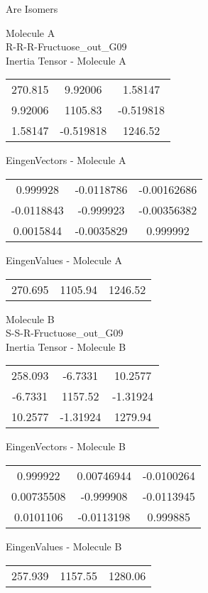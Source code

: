 \begin{center}
\vtab
\vtab
\textcolor{NavyBlue}{\Large Are Isomers}
\end{center}
\newpage
\begin{multicols}{2}
\begin{center}
Molecule A \\ 
R-R-R-Fructuose\_out\_G09
\\
Inertia Tensor - Molecule A \\
\vtab
\begin{tabular}{|c c c|}
270.815	 & 	9.92006	 & 	1.58147	 \\
9.92006	 & 	1105.83	 & 	-0.519818	 \\
1.58147	 & 	-0.519818	 & 	1246.52
\end{tabular}

\vtab
 EingenVectors - Molecule A     \\
\vtab
\begin{tabular}{|c c c|}
0.999928	 & 	-0.0118786	 & 	-0.00162686	 \\
-0.0118843	 & 	-0.999923	 & 	-0.00356382	 \\
0.0015844	 & 	-0.0035829	 & 	0.999992
\end{tabular}

\vtab
 EingenValues - Molecule A     \\
\vtab
\begin{tabular}{|c c c|}
270.695	 & 	1105.94	 & 	1246.52
\end{tabular}
\columnbreak

Molecule B \\ 
S-S-R-Fructuose\_out\_G09
\\
Inertia Tensor - Molecule B \\
\vtab
\begin{tabular}{|c c c|}
258.093	 & 	-6.7331	 & 	10.2577	 \\
-6.7331	 & 	1157.52	 & 	-1.31924	 \\
10.2577	 & 	-1.31924	 & 	1279.94
\end{tabular}

\vtab
 EingenVectors - Molecule B     \\
\vtab
\begin{tabular}{|c c c|}
0.999922	 & 	0.00746944	 & 	-0.0100264	 \\
0.00735508	 & 	-0.999908	 & 	-0.0113945	 \\
0.0101106	 & 	-0.0113198	 & 	0.999885
\end{tabular}

\vtab
 EingenValues - Molecule B     \\
\vtab
\begin{tabular}{|c c c|}
257.939	 & 	1157.55	 & 	1280.06
\end{tabular}

\end{center}
\end{multicols}
